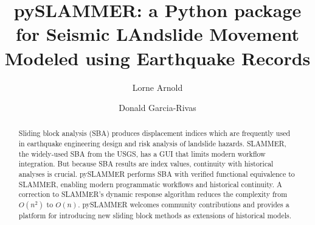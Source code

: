 \documentclass[preprint,review,12pt]{elsarticle}
\begin{document}
\renewcommand{\labelenumii}{\arabic{enumi}.\arabic{enumii}}

\begin{frontmatter}
 


\title{pySLAMMER: a Python package for Seismic LAndslide Movement Modeled using Earthquake Records}


\author[label1]{Lorne Arnold}
\author[]{Donald Garcia-Rivas}
\address[label1]{University of Washington Tacoma, 1900 Commerce St., Tacoma, WA, arnoldl@uw.edu}

\begin{abstract}
Sliding block analysis (SBA) produces displacement indices which are frequently used in earthquake engineering design and risk analysis of landslide hazards.
SLAMMER, the widely-used SBA from the USGS, has a GUI that limits modern workflow integration.
But because SBA results are index values, continuity with historical analyses is crucial.
pySLAMMER performs SBA with verified functional equivalence to SLAMMER, enabling modern programmatic workflows and historical continuity.
A correction to SLAMMER's dynamic response algorithm reduces the complexity from $O(n^2)$ to $O(n)$. 
pySLAMMER welcomes community contributions and provides a platform for introducing new sliding block methods as extensions of historical models.


\end{abstract}



\end{frontmatter}
\end{document}
